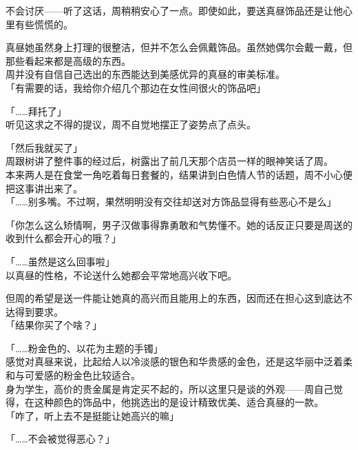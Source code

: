 不会讨厌——听了这话，周稍稍安心了一点。即使如此，要送真昼饰品还是让他心里有些慌慌的。

真昼她虽然身上打理的很整洁，但并不怎么会佩戴饰品。虽然她偶尔会戴一戴，但那些看起来都是高级的东西。\\

周并没有自信自己选出的东西能达到美感优异的真昼的审美标准。\\

「有需要的话，我给你介绍几个那边在女性间很火的饰品吧」

「……拜托了」\\

听见这求之不得的提议，周不自觉地摆正了姿势点了点头。\\

\vspace{2\baselineskip}

「然后我就买了」\\

周跟树讲了整件事的经过后，树露出了前几天那个店员一样的眼神笑话了周。\\

本来两人是在食堂一角吃着每日套餐的，结果讲到白色情人节的话题，周不小心便把这事讲出来了。\\

「……别多嘴。不过啊，果然明明没有交往却送对方饰品显得有些恶心不是么」

「你怎么这么矫情啊，男子汉做事得靠勇敢和气势懂不。她的话反正只要是周送的收到什么都会开心的哦？」

「……虽然是这么回事啦」\\

以真昼的性格，不论送什么她都会平常地高兴收下吧。

但周的希望是送一件能让她真的高兴而且能用上的东西，因而还在担心这到底达不达得到要求。\\

「结果你买了个啥？」

「……粉金色的、以花为主题的手镯」\\

感觉对真昼来说，比起给人以冷淡感的银色和华贵感的金色，还是这华丽中泛着柔和与可爱感的粉金色比较适合。\\

身为学生，高价的贵金属是肯定买不起的，所以这里只是谈的外观——周自己觉得，在这种颜色的饰品中，他挑选出的是设计精致优美、适合真昼的一款。\\

「咋了，听上去不是挺能让她高兴的嘛」

「……不会被觉得恶心？」

